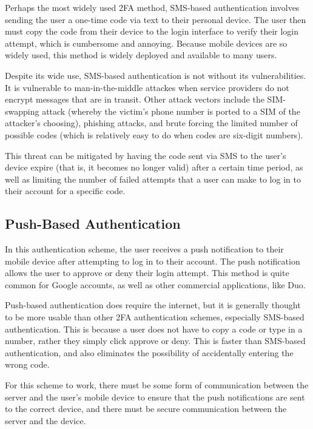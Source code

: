 \documentclass[11pt]{article}
\begin{document}
Perhaps the most widely used 2FA method, SMS-based authentication
involves sending the user a one-time code via text to their personal
device. The user then must copy the code from their device to the login
interface to verify their login attempt, which is cumbersome and
annoying. Because mobile devices are so widely used, this method is
widely deployed and available to many users. 

Despite its wide use, SMS-based authentication is not without its
vulnerabilities. It is vulnerable to man-in-the-middle attackes when
service providers do not encrypt messages that are in transit. Other
attack vectors include the SIM-swapping attack (whereby the victim's
phone number is ported to a SIM of the attacker's choosing), phishing
attacks, and brute forcing the limited number of possible codes (which
is relatively easy to do when codes are six-digit numbers). 

This threat can be mitigated by having the code sent via SMS to the
user's device expire (that is, it becomes no longer valid) after a
certain time period, as well as limiting the number of failed attempts
that a user can make to log in to their account for a specific code. 

\subsection{Push-Based Authentication}

In this authentication scheme, the user receives a push notification to
their mobile device after attempting to log in to their account. The
push notification allows the user to approve or deny their login
attempt. This method is quite common for Google accounts, as well as
other commercial applications, like Duo. 

Push-based authentication does require the internet, but it is generally
thought to be more usable than other 2FA authentication schemes,
especially SMS-based authentication. This is because a user does not
have to copy a code or type in a number, rather they simply click
approve or deny. This is faster than SMS-based authentication, and also
eliminates the possibility of accidentally entering the wrong code. 

For this scheme to work, there must be some form of communication
between the server and the user's mobile device to ensure that the push
notifications are sent to the correct device, and there must be secure
communication between the server and the device. 
\end{document}
